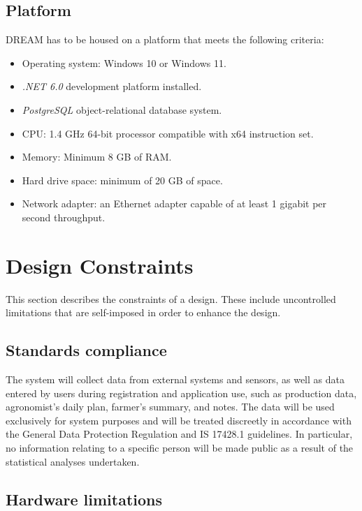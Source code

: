 \subsection{Platform}

DREAM has to be housed on a platform that meets the following criteria:

\begin{itemize}
    \item Operating system: Windows 10 or Windows 11.    
    \item \textit{.NET 6.0} development platform installed.
    \item \textit{PostgreSQL} object-relational database system.
    \item CPU: 1.4 GHz 64-bit processor compatible with x64 instruction set.
    \item Memory: Minimum 8 GB of RAM. 
    \item Hard drive space: minimum of 20 GB of space.
    \item Network adapter: an Ethernet adapter capable of at least 1 gigabit per second throughput.
\end{itemize}

\section{Design Constraints}

This section describes the constraints of a design. These include uncontrolled limitations that are self-imposed in order to enhance the design.

\subsection{Standards compliance}

The system will collect data from external systems and sensors, as well as data entered by users during registration and application use, such as production data, agronomist's daily plan, farmer's summary, and notes. The data will be used exclusively for system purposes and will be treated discreetly in accordance with the General Data Protection Regulation \cite{GDPR} and IS 17428.1 \cite{india_privacy_doc} guidelines. In particular, no information relating to a specific person will be made public as a result of the statistical analyses undertaken.

\subsection{Hardware limitations}

